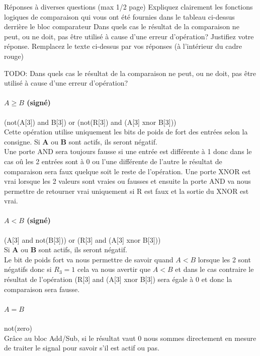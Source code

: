 \documentclass[a4paper]{article}
\begin{document}
\begin{tcolorbox}[colframe=Monokaimagenta,colback=white]
Réponses à diverses questions (max 1/2 page)
Expliquez clairement les fonctions logiques de comparaison qui vous ont été fournies dans le tableau ci-dessus derrière le bloc comparateur 
Dans quels cas le résultat de la comparaison ne peut, ou ne doit, pas être utilisé à cause d’une erreur d’opération? Justifiez votre réponse.
Remplacez le texte ci-dessus par vos réponses (à l’intérieur du cadre rouge)

TODO: Dans quels cas le résultat de la comparaison ne peut, ou ne doit, pas être utilisé à cause d’une erreur d’opération? 

\paragraph{$A \ge B$ (signé)} (not(A[3]) and B[3]) or (not(R[3]) and (A[3] xnor B[3]))\\
Cette opération utilise uniquement les bits de poids de fort des entrées selon la consigne.
Si \textbf{A} ou \textbf{B} sont actifs, ils seront négatif.\\
Une porte AND sera toujours fausse si une entrée est différente à 1 donc dans le cas oû les 2 entrées sont à 0 ou l'une différente de l'autre le résultat de comparaison sera faux quelque soit le reste de l'opération. Une porte XNOR est vrai lorsque les 2 valeurs sont vraies ou fausses et ensuite la porte AND va nous permettre de retourner vrai uniquement si R est faux et la sortie du XNOR est vrai.

\paragraph{$A < B$ (signé)} (A[3] and not(B[3])) or (R[3] and (A[3] xnor B[3]))\\
Si \textbf{A} ou \textbf{B} sont actifs, ils seront négatif.\\
Le bit de poids fort va nous permettre de savoir quand $A<B$ lorsque les 2 sont négatifs donc si $R_3=1$ cela va nous avertir que  $A<B$ et dans le cas contraire le résultat de l'opération (R[3] and (A[3] xnor B[3]) sera égale à 0 et donc la comparaison sera fausse.

\paragraph{$A=B$} not(zero)\\
Grâce au bloc Add/Sub, si le résultat vaut 0 nous sommes directement en mesure de traiter le signal pour savoir s'il est actif ou pas.


\end{tcolorbox}
\end{document}
